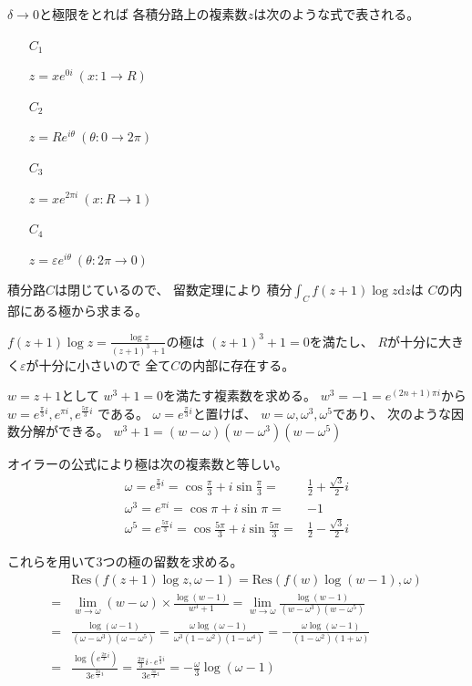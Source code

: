 \documentclass[12pt,b5paper]{ltjsarticle}
\begin{document}
$\delta \to 0$と極限をとれば
各積分路上の複素数$z$は次のような式で表される。
\begin{enumerate}
 \item [$C_1$]

       $z=x e^{0i} \ (x:1 \to R)$

 \item [$C_2$]

       $z=Re^{i\theta} \ (\theta : 0\to 2\pi)$

 \item [$C_3$]

       $z=x e^{2\pi i} \ (x:R\to1)$

 \item [$C_4$]

       $z=\varepsilon e^{i\theta} \ (\theta : 2\pi \to 0)$

\end{enumerate}


積分路$C$は閉じているので、
留数定理により
積分$\int_{C}f(z+1)\log{z}\mathrm{d}z$は
$C$の内部にある極から求まる。

$f(z+1)\log{z}=\frac{\log{z}}{(z+1)^3+1}$の極は
$(z+1)^3+1=0$を満たし、
$R$が十分に大きく$\varepsilon$が十分に小さいので
全て$C$の内部に存在する。

$w=z+1$として
$w^3+1=0$を満たす複素数を求める。
$w^3=-1=e^{(2n+1)\pi i}$から
$w=e^{\frac{\pi}{3}i},e^{\pi i},e^{\frac{5\pi}{3}i}$
である。
$\omega = e^{\frac{\pi}{3}i}$と置けば、
$w= \omega,\omega^3,\omega^5$であり、
次のような因数分解ができる。
$w^3+1 = (w-\omega)(w-\omega^3)(w-\omega^5)$


オイラーの公式により極は次の複素数と等しい。
\begin{align}
 \omega
 = e^{\frac{\pi}{3}i}
 = \cos{\frac{\pi}{3}}+i\sin{\frac{\pi}{3}}
 =& \frac{1}{2}+\frac{\sqrt{3}}{2}i\\
 \omega^3
 = e^{\pi i}
 = \cos{\pi}+i\sin{\pi}
 =& -1\\
 \omega^5
 = e^{\frac{5\pi}{3}i}
 = \cos{\frac{5\pi}{3}}+i\sin{\frac{5\pi}{3}}
 =& \frac{1}{2}-\frac{\sqrt{3}}{2}i
\end{align}

これらを用いて3つの極の留数を求める。
\begin{align}
 & \mathrm{Res}(f(z+1)\log{z},\omega-1)
  =
 \mathrm{Res}(f(w)\log{(w-1)},\omega)\\
 =&
 \lim_{w\to \omega}(w-\omega)\times \frac{\log{(w-1)}}{w^3+1}
  =
 \lim_{w\to \omega} \frac{\log{(w-1)}}{(w-\omega^3)(w-\omega^5)}\\
 =&
 \frac{\log{(\omega-1)}}{(\omega-\omega^3)(\omega-\omega^5)}
 =
 \frac{\omega\log{(\omega-1)}}{\omega^3(1-\omega^2)(1-\omega^4)}
 =
 -\frac{\omega\log{(\omega-1)}}{(1-\omega^2)(1+\omega)}
 \\
 =& \frac{\log{( e^{\frac{2\pi}{3}i} )}}{3 e^{\frac{2\pi}{3}i}}
 = \frac{\frac{2\pi}{3}i \cdot e^{\frac{\pi}{3}i}}{3 e^{\frac{3\pi}{3}i}}
 = -\frac{\omega}{3}\log{(\omega-1)}
\end{align}
\end{document}
